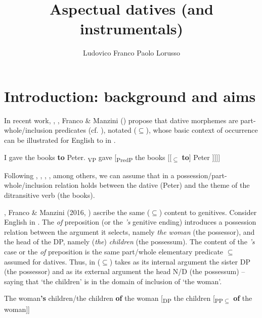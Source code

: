 \documentclass[output=paper,modfonts,nonflat,newtxmath,colorlinks,citecolor=brown]{langsci/langscibook}
\author{Ludovico Franco\affiliation{Università di Firenze}\lastand 
Paolo Lorusso\affiliation{Istituto Universitario Studi Superiori (IUSS) Pavia }}
\title{Aspectual datives (and instrumentals)}
\begin{document}
\maketitle



\section{Introduction: background and aims}
\label{sec:franco:1}

In recent work, \citet{ManziniSavoia2011}, \citet{ManziniFranco2016}, Franco \& Manzini (\citeyear{FrancoManzini2017Gen, FrancoManzini2017Ins}) propose that dative morphemes are part-whole/inclusion predicates (cf.  \citealt{BelvinDenDikken1997}), notated (${\subseteq}$), whose basic context of occurrence can be illustrated for English {to} in .

\ea%
    \label{ex:franco:1}
    \ea I gave the books \textbf{to} Peter.
   \ex  {[}\textsubscript{VP} gave [\textsubscript{PredP} the books [[\textsubscript{${\subseteq}$} \textbf{to}] Peter ]{]]]}
   \z
    \z

Following \citet{Kayne1984}, \citet{Pesetsky1995}, \citet{BeckJohnson2004}, \citet{Harley2002}, among others, we can assume that in  a possession/part-whole/inclusion relation holds between the dative ({Peter}) and the theme of the ditransitive verb ({the books}). 

\citet{ManziniSavoia2011}, Franco \& Manzini (2016, \citeyear{FrancoManzini2017Gen}) ascribe the same (${\subseteq}$) content to genitives. Consider English in . The \textit{of} preposition (or the \textit{’s} genitive ending) introduces a possession relation between the argument it selects, namely \textit{the woman} (the possessor), and the head of the DP, namely (\textit{the}) \textit{children} (the possessum). The content of the \textit{’s} case or the \textit{of} preposition is the same part/whole elementary predicate ${\subseteq}$ assumed for datives. Thus, in  (${\subseteq}$) takes as its internal argument the sister DP (the possessor) and as its external argument the head N/D (the possessum) – saying that ‘the children’ is in the domain of inclusion of ‘the woman’. 

\ea%
    \label{ex:franco:2}
    \ea \label{ex:franco:2a}The woman\textbf{’s} children/the children \textbf{of} the woman
    \ex \label{ex:franco:2b}{[}\textsubscript{DP} the children [\textsubscript{PP${\subseteq}$} \textbf{of} the woman{]]} 
    \z
    \z
\end{document}
